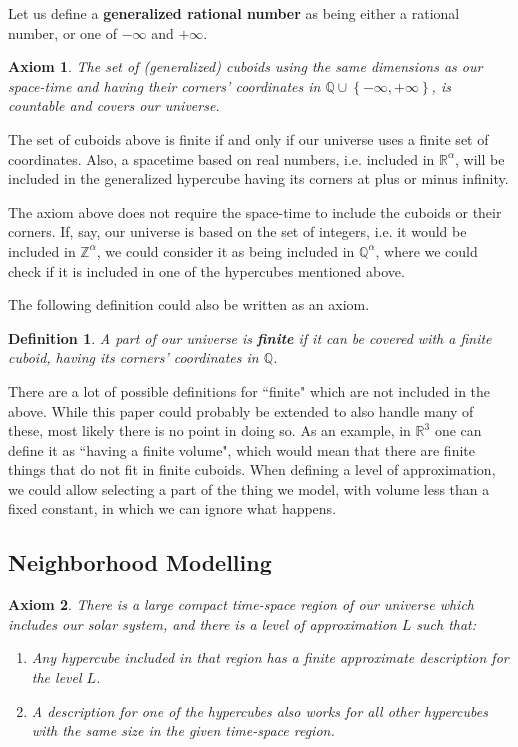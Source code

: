 \documentclass[a4paper
,draft
]{article}
\def\reale{\mathbb{R}}
\def\intregi{\mathbb{Z}}
\def\rationale{\mathbb{Q}}
\newcommand{\multime}[1]{\left\{ #1 \right\}}
\newcommand{\definitie}[1]{\textbf{#1}}
\newcommand{\ghilimele}[1]{``#1"}
\newtheorem{definition}{Definition}
\newtheorem{axiom}{Axiom}
\begin{document}
Let us define a \definitie{generalized rational number} as being either a
rational number, or one of $-\infty$ and $+\infty$.

\begin{axiom}\label{ax:rationalcovering}
  The set of (generalized) cuboids using the same dimensions as our space-time
  and having their corners' coordinates in
  $\rationale\cup\multime{-\infty, +\infty}$,
  is countable and covers our universe.
\end{axiom}

The set of cuboids above is finite if and only if our universe uses a finite
set of coordinates.
Also, a spacetime based on real numbers, i.e. included
in $\reale^\alpha$, will be included in the generalized hypercube having
its corners at plus or minus infinity.

The axiom above does not require the space-time to include the cuboids or
their corners.
If, say, our universe is based on the set of integers, i.e.
it would be included in $\intregi^\alpha$,
we could consider it as being included in $\rationale^\alpha$,
where we could check if it is included in one of the hypercubes mentioned
above.

The following definition could also be written as an axiom.

\begin{definition}\label{finitecuboid}
  A part of our universe is \definitie{finite} if
  it can be covered with a finite cuboid,
  having its corners' coordinates in $\rationale$.
\end{definition}

There are a lot of possible definitions for \ghilimele{finite} which are not
included in the above.
While this paper could probably be extended to also handle many of these,
most likely there is no point in doing so.
As an example, in $\reale^3$ one can define it as
\ghilimele{having a finite volume}, which would
mean that there are finite things that do not fit in finite cuboids.
When defining a level of approximation, we could allow
selecting a part of the thing we model, with volume less than a fixed
constant, in which we can ignore what happens.

\subsection{Neighborhood Modelling}

\begin{axiom}\label{ax:finiteneighborhood}
  There is a large compact time-space region of our universe which
  includes our solar
  system, and there is a level of approximation $L$ such that:
  \begin{enumerate}
    \item Any hypercube included in that region has a finite approximate
          description for the level $L$.
    \item A description for one of the hypercubes also works for all other
          hypercubes with the same size in the given time-space region.
  \end{enumerate}
\end{axiom}
\end{document}
